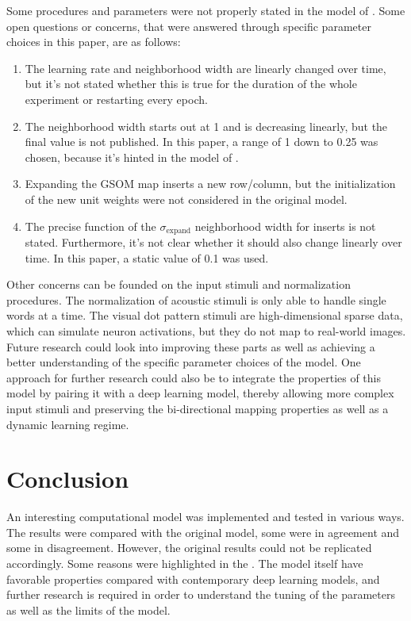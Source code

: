 \documentclass[twocolumn]{article}
\begin{document}
Some procedures and parameters were not properly stated in the model of \textcite{gliozzi_visual_2018}. Some open questions or concerns, that were answered through specific parameter choices in this paper, are as follows:
\begin{enumerate}
    \item
        The learning rate and neighborhood width are linearly changed over time, but it's not stated whether this is true for the duration of the whole experiment or restarting every epoch.
    \item
        The neighborhood width starts out at 1 and is decreasing linearly, but the final value is not published. In this paper, a range of 1 down to 0.25 was chosen, because it's hinted in the model of \textcite{mayor_neurocomputational_2010}.
    \item
        Expanding the GSOM map inserts a new row/column, but the initialization of the new unit weights were not considered in the original model.
    \item
        The precise function of the $\sigma_{\textrm{expand}}$ neighborhood width for inserts is not stated. Furthermore, it's not clear whether it should also change linearly over time. In this paper, a static value of 0.1 was used.
\end{enumerate}
Other concerns can be founded on the input stimuli and normalization procedures. The normalization of acoustic stimuli is only able to handle single words at a time. The visual dot pattern stimuli are high-dimensional sparse data, which can simulate neuron activations, but they do not map to real-world images. Future research could look into improving these parts as well as achieving a better understanding of the specific parameter choices of the model. One approach for further research could also be to integrate the properties of this model by pairing it with a deep learning model, thereby allowing more complex input stimuli and preserving the bi-directional mapping properties as well as a dynamic learning regime.

\section{Conclusion} \label{sec:conclusion}
An interesting computational model was implemented and tested in various ways. The results were compared with the original model, some were in agreement and some in disagreement. However, the original results could not be replicated accordingly. Some reasons were highlighted in the . The model itself have favorable properties compared with contemporary deep learning models, and further research is required in order to understand the tuning of the parameters as well as the limits of the model.
\end{document}
